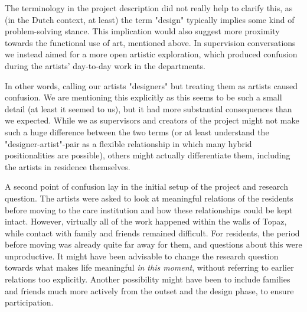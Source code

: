\documentclass[authordate, empirical,issue]{jote-new-article}
\begin{document}
{	

	The terminology in the project description did not really help to clarify this, as (in the Dutch context, at least) the term "design" typically implies some kind of problem-solving stance. This implication would also suggest more proximity towards the functional use of art, mentioned above. In supervision conversations we instead aimed for a more open artistic exploration, which produced confusion during the artists' day-to-day work in the departments.



	



	In other words, calling our artists "designers" but treating them as artists caused confusion. We are mentioning this explicitly as this seems to be such a small detail (at least it seemed to us), but it had more substantial consequences than we expected. While we as supervisors and creators of the project might not make such a huge difference between the two terms (or at least understand the "designer-artist"-pair as a flexible relationship in which many hybrid positionalities are possible), others might actually differentiate them, including the artists in residence themselves.







	A second point of confusion lay in the initial setup of the project and research question. The artists were asked to look at meaningful relations of the residents before moving to the care institution and how these relationships could be kept intact. However, virtually all of the work happened within the walls of Topaz, while contact with family and friends remained difficult. For residents, the period before moving was already quite far away for them, and questions about this were unproductive. It might have been advisable to change the research question towards what makes life meaningful \emph{in this moment}, without referring to earlier relations too explicitly. Another possibility might have been to include families and friends much more actively from the outset and the design phase, to ensure participation.







}
\end{document}
